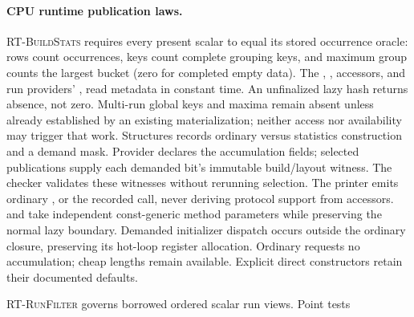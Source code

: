 \paragraph{CPU runtime publication laws.}
\textsc{RT-BuildStats} requires every present scalar to equal its stored
occurrence oracle: rows count occurrences, keys count complete grouping keys,
and maximum group counts the largest bucket (zero for completed empty data).
The , ,  accessors,
and run providers' , read metadata in constant time.
An unfinalized lazy hash returns absence, not zero. Multi-run global keys and
maxima remain absent unless already established by an existing materialization;
neither access nor availability may trigger that work.
Structures records ordinary versus statistics construction and a demand mask.
Provider  declares the accumulation fields; selected
publications supply each demanded bit's immutable build/layout witness.
The checker validates these witnesses without rerunning selection.
The printer emits ordinary , or the recorded
 call, never deriving protocol support from accessors.
 and  take independent
 const-generic method parameters while preserving the
normal lazy boundary. Demanded initializer dispatch occurs outside the
ordinary  closure, preserving its hot-loop register allocation.
Ordinary  requests no accumulation; cheap lengths remain available.
Explicit direct  constructors retain their documented defaults.
\begin{mathpar}
\end{mathpar}
\begin{mathpar}
\end{mathpar}
\textsc{RT-RunFilter} governs borrowed ordered scalar run views. Point tests
